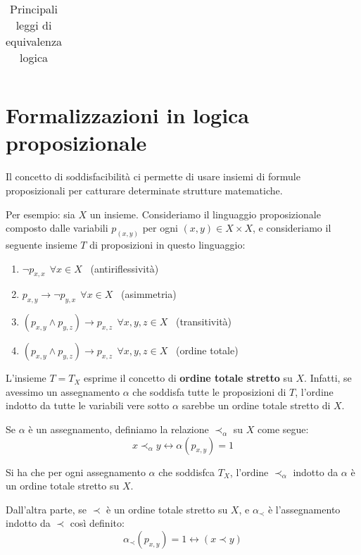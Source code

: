 \documentclass[a4paper,11pt]{report}
\begin{document}
\begin{table}[H]
\begin{tabular}{|l|l|}
            \end{tabular}
            \caption{Principali leggi di equivalenza logica}
        \end{table}

        \section{Formalizzazioni in logica proposizionale}

        Il concetto di soddisfacibilità ci permette di usare insiemi di formule proposizionali per catturare determinate strutture matematiche.

        Per esempio: sia \( X \) un insieme. Consideriamo il linguaggio proposizionale composto dalle variabili \(p_{(x, y)}  \) per ogni \( (x,y) \in X \times X\), e consideriamo il seguente insieme \( T \) di proposizioni in questo linguaggio:

        \begin{enumerate}
            \item \( \neg p_{x,x} \ \ \forall x \in X\) \ {\color{gray}(antiriflessività)}
            \item \( p_{x, y} \to \neg p_{y,x} \ \   \forall x \in X\) \ {\color{gray}(asimmetria)}
            \item \( (p_{x, y} \land p_{y, z}) \to p_{x, z} \ \ \forall x, y, z \in X\) \ {\color{gray}(transitività)}
            \item \( (p_{x, y} \land p_{y, z}) \to p_{x, z} \  \ \forall x, y, z \in X\) \ {\color{gray}(ordine totale)}
        \end{enumerate}

        L'insieme \( T = T_X \) esprime il concetto di \textbf{ordine totale stretto} su \( X \). Infatti, se avessimo un assegnamento \( \alpha \) che soddisfa tutte le proposizioni di \( T \), l'ordine indotto da tutte le variabili vere sotto \( \alpha \) sarebbe un ordine totale stretto di \( X  \).

        Se \( \alpha \) è un assegnamento, definiamo la relazione \( \prec_{\alpha} \) su \( X \) come segue:
        \[ x \prec_\alpha y \leftrightarrow \alpha(p_{x,y})=1 \]

        Si ha che per ogni assegnamento \( \alpha \) che soddisfca \( T_X \), l'ordine \( \prec_\alpha \) indotto da \( \alpha \) è un ordine totale stretto su \( X \).

        Dall'altra parte, se \( \prec \) è un ordine totale stretto su \( X \), e \( \alpha_\prec \) è l'assegnamento indotto da \( \prec \) così definito:
        \[ \alpha_\prec (p_{x,y}) = 1 \leftrightarrow (x \prec y) \]
\end{document}
